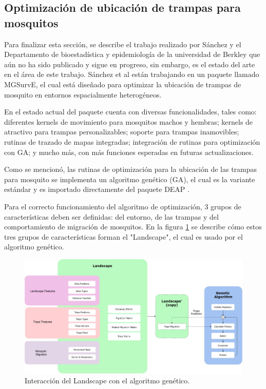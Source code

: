 \documentclass[letterpaper]{report}
\begin{document}
  \subsection{Optimización de ubicación de trampas para mosquitos}
    \label{subsection:mgsurve}
    Para finalizar esta sección, se describe el
    trabajo realizado por Sánchez y el Departamento de bioestadística y
    epidemiología de la universidad de Berkley \cite{MGSurvE} que aún no ha sido
    publicado y sigue en progreso, sin embargo, es el estado del arte en el área
    de este trabajo. Sánchez et al están trabajando en un paquete llamado
    MGSurvE, el cual está diseñado para optimizar la ubicación de trampas de
    mosquito en entornos espacialmente heterogéneos. 

    En el estado actual del paquete cuenta con diversas funcionalidades, tales
    como: diferentes kernels de movimiento para mosquitos machos y hembras;
    kernels de atractivo para trampas personalizables; soporte para trampas
    inamovibles; rutinas de trazado de mapas integradas; integración de rutinas
    para optimización con GA; y mucho más, con más funciones esperadas en
    futuras actualizaciones.

    Como se mencionó, las rutinas de optimización para la ubicación de las
    trampas para mosquito se implementa un algoritmo genético (GA), el cual es
    la variante estándar y es importado directamente del paquete DEAP
    \cite{DEAP}.

    Para el correcto funcionamiento del algoritmo de optimización, 3 grupos de
    características deben ser definidas: del entorno, de las trampas y del
    comportamiento de migración de mosquitos. En la figura
    \ref{fig:mgsurve-landscape-diagram} se describe cómo estos tres grupos de
    características forman el "Landscape", el cual es usado por el algoritmo 
    genético. 

    \begin{figure}[ht!]
      \includegraphics[width=\textwidth]{fig:mgsurve-landscape-diagram.jpeg}
      \centering
      \caption{Interacción del Landscape con el algoritmo genético.}
      \label{fig:mgsurve-landscape-diagram}
      \centering
    \end{figure}
\end{document}
